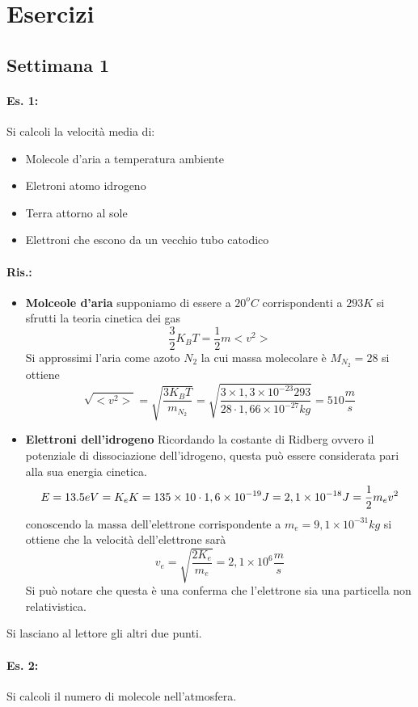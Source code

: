 \section{Esercizi}
\subsection{Settimana 1}
\paragraph{Es. 1:}
Si calcoli la velocità media di:
\begin{itemize}
\item Molecole d'aria a temperatura ambiente
\item Eletroni atomo idrogeno
\item Terra attorno al sole
\item Elettroni che escono da un vecchio tubo catodico
\end{itemize}
\paragraph{Ris.:}
\begin{itemize}
\item \textbf{Molceole d'aria}
supponiamo di essere a $20^oC$ corrispondenti a $293K$ si sfrutti la teoria cinetica dei gas
\begin{equation}
\frac{3}{2}K_BT=\frac{1}{2}m<v^2>
\end{equation}
Si approssimi l'aria come azoto $N_2$ la cui massa molecolare è $M_{N_2}=28$
si ottiene
\[
\sqrt{<v^2>}=\sqrt{\frac{3K_BT}{m_{N_2}}}=\sqrt{\frac{3\times1,3\times10^{-23}293}{28\cdot 1,66\times10^{-27}kg}}=510\frac{m}{s}
\]
\item \textbf{Elettroni dell'idrogeno}
Ricordando la costante di Ridberg ovvero il potenziale di dissociazione dell'idrogeno, questa può essere considerata pari alla sua energia cinetica.
\[
E=13.5eV=K_e\\
K=135\times10\cdot1,6\times10^{-19}J=2,1\times10^{-18}J=\frac{1}{2}m_ev^2
\]
conoscendo la massa dell'elettrone corrispondente a $m_e=9,1\times10^{-31}kg$ si ottiene che la velocità dell'elettrone sarà
\[
v_e=\sqrt{\frac{2K_e}{m_e}}=2,1\times10^6\frac{m}{s}
\]
Si può notare che questa è una conferma che l'elettrone sia una particella non relativistica.
\end{itemize}
Si lasciano al lettore gli altri due punti.

\paragraph{Es. 2:}
Si calcoli il numero di molecole nell'atmosfera.

